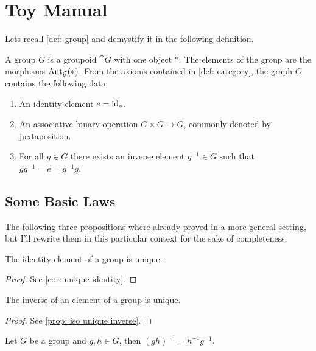 \section{Toy Manual}

Lets recall \cref{def: group} and demystify it in the following definition.

\begin{definition}[Group]
A group \(G\) is a groupoid \(\cat G\) with one object \(*\). The elements of
the group are the morphisms \(\operatorname{Aut}_{\mathcal G}(*)\). From the axioms contained in
\cref{def: category}, the graph \(G\) contains the following data:
\begin{enumerate}[(G1)]
  \item An identity element \(e = \operatorname{id}_*\).
  \item An associative binary operation \(G \times G \to G\), commonly denoted
    by juxtaposition.
  \item For all \(g \in G\) there exists an inverse element \(g^{-1} \in G\)
    such that \(g g^{-1} = e = g^{-1} g\).
\end{enumerate}
\end{definition}

\subsection{Some Basic Laws}

The following three propositions where already proved in a more general setting,
but I'll rewrite them in this particular context for the sake of completeness.

\begin{proposition}
The identity element of a group is unique.
\end{proposition}

\begin{proof}
See \cref{cor: unique identity}.
\end{proof}

\begin{proposition}
The inverse of an element of a group is unique.
\end{proposition}

\begin{proof}
See \cref{prop: iso unique inverse}.
\end{proof}

\begin{proposition}
Let \(G\) be a group and \(g, h \in G\), then \((g h)^{-1} = h^{-1} g^{-1}\).
\end{proposition}

